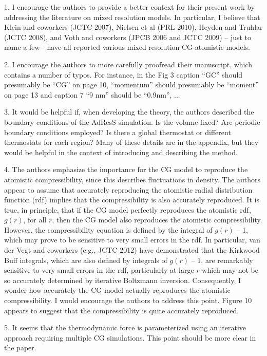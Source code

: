 \documentclass[a4paper]{article}
\begin{document}
1. I encourage the authors to provide a better context for their
present work by addressing the literature on mixed resolution
models. In particular, I believe that Klein and coworkers (JCTC 2007),
Nielsen et al (PRL 2010), Heyden and Truhlar (JCTC 2008), and Voth and
coworkers (JPCB 2006 and JCTC 2009) – just to name a few - have all
reported various mixed resolution CG-atomistic models.

2. I encourage the authors to more carefully proofread their
manuscript, which contains a number of typos. For instance, in the Fig
3 caption ``GC'' should presumably be ``CG'' on page 10, ``momentum'' should
presumably be ``moment'' on page 13 and caption 7 “9 nm” should be
``0.9nm'', ...

3. It would be helpful if, when developing the theory, the authors
described the boundary conditions of the AdResS simulation. Is the
volume fixed? Are periodic boundary conditions employed? Is there a
global thermostat or different thermostats for each region? Many of
these details are in the appendix, but they would be helpful in the
context of introducing and describing the method.

4. The authors emphasize the importance for the CG model to reproduce
the atomistic compressibility, since this describes fluctuations in
density. The authors appear to assume that accurately reproducing the
atomistic radial distribution function (rdf) implies that the
compressibility is also accurately reproduced. It is true, in
principle, that if the CG model perfectly reproduces the atomistic
rdf, $g(r)$, for all $r$, then the CG model also reproduces the atomistic
compressibility. However, the compressibility equation is defined by
the integral of $g(r)$ – 1, which may prove to be sensitive to very
small errors in the rdf. In particular, van der Vegt and coworkers
(e.g., JCTC 2012) have demonstrated that the Kirkwood Buff integrals,
which are also defined by integrals of $g(r)$ – 1, are remarkably
sensitive to very small errors in the rdf, particularly at large $r$
which may not be so accurately determined by iterative Boltzmann
inversion. Consequently, I wonder how accurately the CG model actually
reproduces the atomistic compressibility. I would encourage the
authors to address this point. Figure 10 appears to suggest that the
compressibility is quite accurately reproduced.

5. It seems that the thermodynamic force is parameterized using an
iterative approach requiring multiple CG simulations. This point
should be more clear in the paper.
\end{document}
